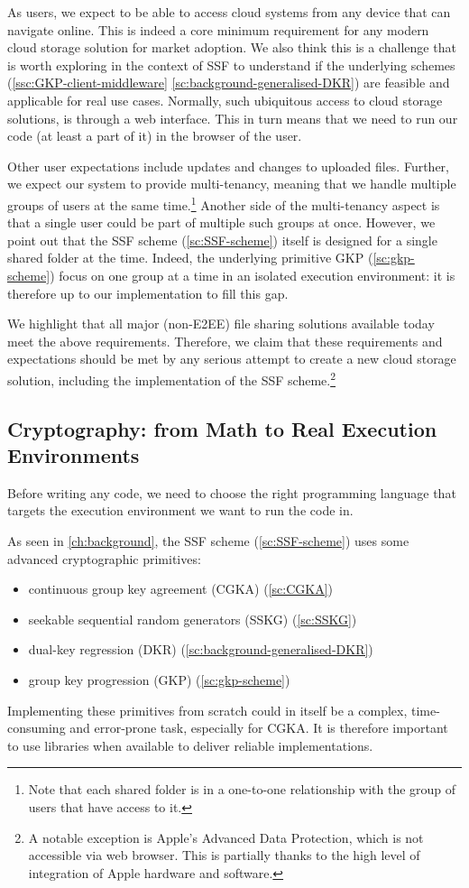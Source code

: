 As users, we expect to be able to access 
cloud systems from any device that can navigate online.
This is indeed a core minimum requirement for any modern
cloud storage solution for market adoption.
We also think this is a challenge that is worth exploring
in the context of SSF to understand if the underlying
schemes (\cref{ssc:GKP-client-middleware} \cref{sc:background-generalised-DKR})
are feasible and applicable for real use cases.
Normally, such ubiquitous access to cloud storage solutions,
is through a web interface.
This in turn means that we need to run our code (at least a part of it) 
in the browser of the user.

Other user expectations include updates and changes to uploaded files.
Further, we expect our system to provide multi-tenancy,
meaning that we handle multiple groups of users at the same time.\footnote{Note that each shared folder is in a one-to-one relationship with the group of users that have access to it.} 
Another side of the multi-tenancy aspect is that a 
single user could be part of multiple such groups at once. 
However, we point out that the SSF scheme (\cref{sc:SSF-scheme}) 
itself is designed for a single shared folder at the time.
Indeed, the underlying primitive GKP (\cref{sc:gkp-scheme}) focus 
on one group at a time in an isolated execution environment:
it is therefore up to our implementation to fill this gap.

We highlight that all major (non-E2EE) file sharing solutions available today meet the above requirements.
Therefore, we claim that these requirements and expectations should be met by any serious attempt to create a new cloud storage solution, including the implementation of the SSF scheme.\footnote{A notable exception is Apple's Advanced Data Protection, which is not accessible via web browser. This is partially thanks to the high level of integration of Apple hardware and software.}

\subsection{Cryptography: from Math to Real Execution Environments}\label{sc:abstract-to-real}

Before writing any code, we need to choose the right 
programming language that targets the execution environment
we want to run the code in.

As seen in \cref{ch:background}, the SSF scheme (\cref{sc:SSF-scheme})
uses some advanced cryptographic primitives:
\begin{itemize}
    \item continuous group key agreement (CGKA) (\cref{sc:CGKA})
    \item seekable sequential random generators (SSKG) (\cref{sc:SSKG})
    \item dual-key regression (DKR) (\cref{sc:background-generalised-DKR})
    \item group key progression (GKP) (\cref{sc:gkp-scheme})
\end{itemize}
Implementing these primitives from scratch could in itself
be a complex, time-consuming and error-prone task, especially for CGKA.
It is therefore important to use libraries when available
to deliver reliable implementations.

